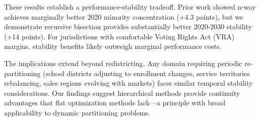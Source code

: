 These results establish a performance-stability tradeoff. Prior work showed n-way achieves marginally better 2020 minority concentration (+4.3 points), but we demonstrate recursive bisection provides substantially better 2020-2030 stability (+14 points). For jurisdictions with comfortable Voting Rights Act (VRA) margins, stability benefits likely outweigh marginal performance costs.

The implications extend beyond redistricting. Any domain requiring periodic re-partitioning (school districts adjusting to enrollment changes, service territories rebalancing, sales regions evolving with markets) faces similar temporal stability considerations. Our findings suggest hierarchical methods provide continuity advantages that flat optimization methods lack—a principle with broad applicability to dynamic partitioning problems.

